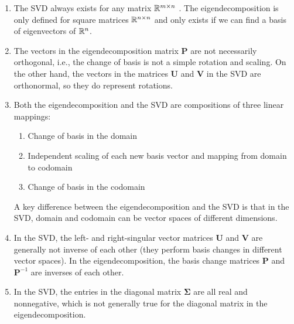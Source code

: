 \begin{enumerate}
    \item The SVD always exists for any matrix $\mathbb{R}^{m\times n}$ .
    The eigendecomposition is only defined for square matrices $\mathbb{R}^{n\times n}$ and only exists if we can find a basis of eigenvectors of $\mathbb{R}^n$.
    \hfill \cite{mfml/book/mml/Deisenroth-Faisal-Ong}

    \item The vectors in the eigendecomposition matrix $\bm{P}$ are not necessarily orthogonal, i.e., the change of basis is not a simple rotation and scaling.
    On the other hand, the vectors in the matrices $\bm{U}$ and $\bm{V}$ in the SVD are orthonormal, so they do represent rotations.
    \hfill \cite{mfml/book/mml/Deisenroth-Faisal-Ong}

    \item Both the eigendecomposition and the SVD are compositions of three linear mappings:
    \hfill \cite{mfml/book/mml/Deisenroth-Faisal-Ong}
    \begin{enumerate}
        \item Change of basis in the domain
        \hfill \cite{mfml/book/mml/Deisenroth-Faisal-Ong}

        \item Independent scaling of each new basis vector and mapping from domain to codomain
        \hfill \cite{mfml/book/mml/Deisenroth-Faisal-Ong}

        \item Change of basis in the codomain
        \hfill \cite{mfml/book/mml/Deisenroth-Faisal-Ong}
    \end{enumerate}
    A key difference between the eigendecomposition and the SVD is that in the SVD, domain and codomain can be vector spaces of different dimensions.
    \hfill \cite{mfml/book/mml/Deisenroth-Faisal-Ong}

    \item In the SVD, the left- and right-singular vector matrices $\bm{U}$ and $\bm{V}$ are generally not inverse of each other (they perform basis changes in different vector spaces).
    In the eigendecomposition, the basis change matrices $\bm{P}$ and $\bm{P}^{ -1}$ are inverses of each other.
    \hfill \cite{mfml/book/mml/Deisenroth-Faisal-Ong}

    \item In the SVD, the entries in the diagonal matrix $\bm{\Sigma}$ are all real and nonnegative, which is not generally true for the diagonal matrix in the eigendecomposition.
    \hfill \cite{mfml/book/mml/Deisenroth-Faisal-Ong}


\end{enumerate}
